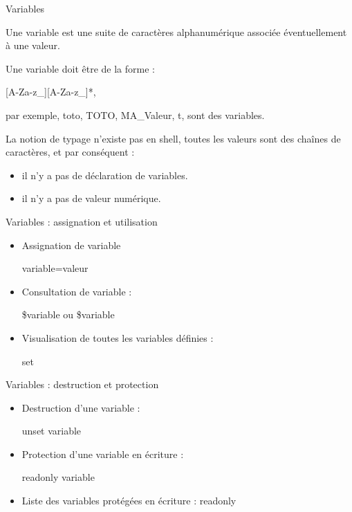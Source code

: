 \documentclass[10pt]{beamer}
\begin{document}
\begin{frame}{Variables}

Une variable est une suite de caractères alphanumérique associée éventuellement à une valeur.

Une variable doit être de la forme :
 \begin{center}
 [A-Za-z\_][A-Za-z\_]*,
 \end{center}
 par exemple, toto, TOTO, MA\_Valeur, t, sont des variables.

 \pause
 La notion de typage n'existe pas en shell, toutes les valeurs sont des chaînes de caractères, et par conséquent :
 \begin{itemize}
 \item il n'y a pas de déclaration de variables.
 \item il n'y a pas de valeur numérique.
 \end{itemize}
 \end{frame}

\begin{frame}{Variables : assignation et utilisation}

\begin{itemize}
\item Assignation de variable
\begin{center}
variable=valeur
\end{center}
\item Consultation de variable :
\begin{center}
\$variable ou \${variable}
\end{center}
\item Visualisation de toutes les variables définies :
\begin{center}
set
\end{center}
\end{itemize}
\end{frame}

\begin{frame}{Variables : destruction et protection}
\begin{itemize}
\item Destruction d’une variable :
\begin{center}
\alert{unset} variable
\end{center}
\item Protection d’une variable en écriture :
\begin{center}
\alert{readonly} variable
\end{center}
\item Liste des variables protégées en écriture : \alert{readonly}
\end{itemize}
\end{frame}
\end{document}
